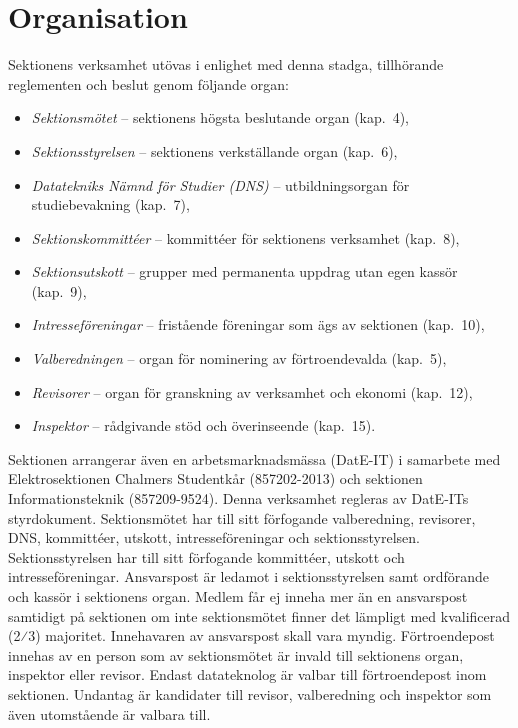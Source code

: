 \documentclass[a4paper]{dteklag}
\begin{document}
\section{Organisation}
 Sektionens verksamhet utövas i enlighet med denna stadga, tillhörande reglementen och beslut genom följande organ:
\begin{itemize}\setlength\itemsep{0em}
\item \textit{Sektionsmötet} – sektionens högsta beslutande organ (kap.~4),
\item \textit{Sektionsstyrelsen} – sektionens verkställande organ (kap.~6),
\item \textit{Datatekniks Nämnd för Studier (DNS)} – utbildningsorgan för studiebevakning (kap.~7),
\item \textit{Sektionskommittéer} – kommittéer för sektionens verksamhet (kap.~8),
\item \textit{Sektionsutskott} – grupper med permanenta uppdrag utan egen kassör (kap.~9),
\item \textit{Intresseföreningar} – fristående föreningar som ägs av sektionen (kap.~10),
\item \textit{Valberedningen} – organ för nominering av förtroendevalda (kap.~5),
\item \textit{Revisorer} – organ för granskning av verksamhet och ekonomi (kap.~12),
\item \textit{Inspektor} – rådgivande stöd och överinseende (kap.~15).
\end{itemize}
\stycke Sektionen arrangerar även en arbetsmarknadsmässa (DatE-IT) i samarbete med Elektrosektionen Chalmers Studentkår (857202-2013) och sektionen Informationsteknik (857209-9524). Denna verksamhet regleras av DatE-ITs styrdokument. 
\para[Ansvarsförhållanden] Sektionsmötet har till sitt förfogande valberedning, revisorer, DNS, kommittéer, utskott, intresseföreningar och sektionsstyrelsen.
\para Sektionsstyrelsen har till sitt förfogande kommittéer, utskott och intresseföreningar.
\para[Ansvarspost] Ansvarspost är ledamot i sektionsstyrelsen samt ordförande och kassör i sektionens organ.
\para Medlem får ej inneha mer än en ansvarspost samtidigt på sektionen om inte
sektionsmötet finner det lämpligt med kvalificerad (2⁄3) majoritet.
\para Innehavaren av ansvarspost skall vara myndig.
\para[Förtroendepost] Förtroendepost innehas av en person som av sektionsmötet är invald till sektionens organ, inspektor eller revisor.
\para Endast datateknolog är valbar till förtroendepost inom sektionen. 
\stycke Undantag är kandidater till revisor, valberedning och inspektor som även utomstående är valbara till.
\end{document}
